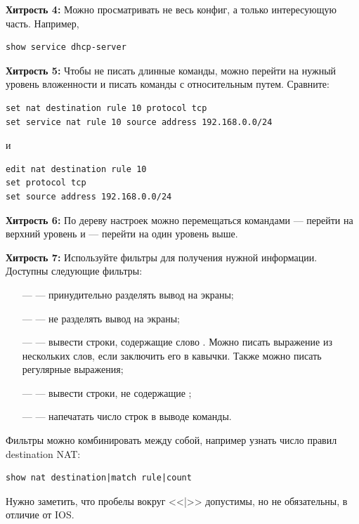 \documentclass[a4paper,12pt, twoside, russian]{report}
\begin{document}
\par\noindent \textbf{Хитрость 4:} Можно просматривать не весь конфиг, а только интересующую часть.
Например, \begin{verbatim}show service dhcp-server\end{verbatim}

\par\noindent \textbf{Хитрость 5:} Чтобы не писать длинные команды, можно перейти на нужный уровень вложенности и
писать команды с относительным путем. Сравните:
\begin{verbatim}
set nat destination rule 10 protocol tcp
set service nat rule 10 source address 192.168.0.0/24
\end{verbatim}
и
\begin{verbatim}
edit nat destination rule 10
set protocol tcp
set source address 192.168.0.0/24
\end{verbatim}

\par\noindent \textbf{Хитрость 6:} По дереву настроек можно перемещаться командами  --- перейти
на верхний уровень и  --- перейти на один уровень выше. 

\par\noindent \textbf{Хитрость 7:} Используйте фильтры для получения нужной информации.
Доступны следующие фильтры:
\begin{itemize}
 \item[---]  --- принудительно разделять вывод на экраны;
 \item[---]  --- не разделять вывод на экраны;
 \item[---]  --- вывести строки, содержащие слово . Можно писать
выражение из нескольких слов, если заключить его в кавычки. Также можно писать регулярные выражения;
 \item[---]  --- вывести строки, не содержащие ;
 \item[---]  --- напечатать число строк в выводе команды.
\end{itemize}

Фильтры можно комбинировать между собой, например узнать число правил destination NAT:
\begin{verbatim}
show nat destination|match rule|count
\end{verbatim}

Нужно заметить, что пробелы вокруг <<|>> допустимы, но не обязательны, в отличие от IOS.
\end{document}
